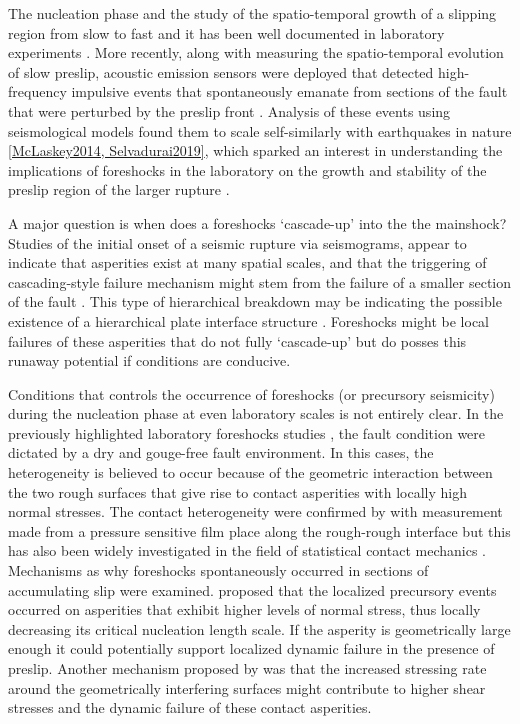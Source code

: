 \documentclass[final,3p, 11pt,authoryear]{elsarticle}
\begin{document}
The nucleation phase and the study of the spatio-temporal growth of a slipping region from slow to fast and it has been well documented in laboratory experiments \citep{Dieterich1978, Okubu1984, Yamashita1992, Ohnaka1999, Nielsen2010, Latour2013, Fukuyama2018, Zhuo2018, McLaskey2017, Ke2018, Buijze2020}. More recently, along with measuring the spatio-temporal evolution of slow preslip, acoustic emission sensors were deployed that detected high-frequency impulsive events that spontaneously emanate from sections of the fault that were perturbed by the preslip front \citep{Shengli2002, McLaskey2013, Selvadurai2015}.  Analysis of these events using seismological models found them to scale self-similarly with earthquakes in nature \ref{McLaskey2014, Selvadurai2019}, which sparked an interest in understanding the implications of foreshocks in the laboratory on the growth and stability of the preslip region of the larger rupture \citep{McLaskey2019}.  

A major question is when does a foreshocks `cascade-up' into the the mainshock? Studies of the initial onset of a seismic rupture via seismograms, appear to indicate that asperities exist at many spatial scales, and that the triggering of cascading-style failure mechanism might stem from the failure of a smaller section of the fault \citep{Okuda2018, Ide2019}. This type of hierarchical breakdown may be indicating the possible existence of a hierarchical plate interface structure \citep{Ide2005, Aochi2014, Aochi2017}.  Foreshocks might be local failures of these asperities that do not fully `cascade-up' but do posses this runaway potential if conditions are conducive. 

Conditions that controls the occurrence of foreshocks (or precursory seismicity) during the nucleation phase at even laboratory scales is not entirely clear. In the previously highlighted laboratory foreshocks studies \citep{McLaskey2013, Selvadurai2015}, the fault condition were dictated by a dry and gouge-free fault environment.  In this cases, the heterogeneity is believed to occur because of the geometric interaction between the two rough surfaces that give rise to contact asperities with locally high normal stresses.  The contact heterogeneity were confirmed by \citet{Selvadurai2017} with measurement made from a pressure sensitive film place along the rough-rough interface but this has also been widely investigated in the field of statistical contact mechanics \citep[e.g.][]{Johnson1985, Persson2006}. Mechanisms as why foreshocks spontaneously occurred in sections of accumulating slip were examined.  \citet{Selvadurai2017} proposed that the localized precursory events occurred on asperities that exhibit higher levels of normal stress, thus locally decreasing its critical nucleation length scale. If the asperity is geometrically large enough it could potentially support localized dynamic failure in the presence of preslip. Another mechanism proposed by \citet{McLaskey2013} was that the increased stressing rate around the geometrically interfering surfaces might contribute to higher shear stresses and the dynamic failure of these contact asperities.  
\end{document}

